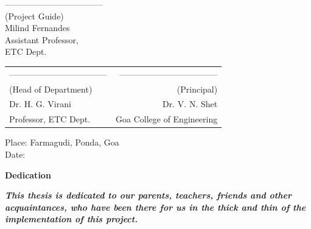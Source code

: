 \noindent -----------------------------------\\
(Project Guide)\\
Milind Fernandes\\
Assistant Professor,\\
ETC Dept.\\



\begin{table}[H]
\begin{tabular}{lr}
\noindent ----------------------------------- & \hspace{6cm} ----------------------------------- \\
(Head of Department) & (Principal)\\
Dr. H. G. Virani & Dr. V. N. Shet\\
Professor, ETC Dept. & Goa College of Engineering\\
\end{tabular}
\end{table}
\noindent Place: Farmagudi, Ponda, Goa\\
\noindent Date: 

\newpage

\begin{center}
\begin{huge}
\bfseries{Dedication}
\end{huge}
\end{center}
\textbf{\textit {This thesis is dedicated to our parents, teachers, friends and
other acquaintances, who have been there for us in the thick
and thin of the implementation of this project.}}